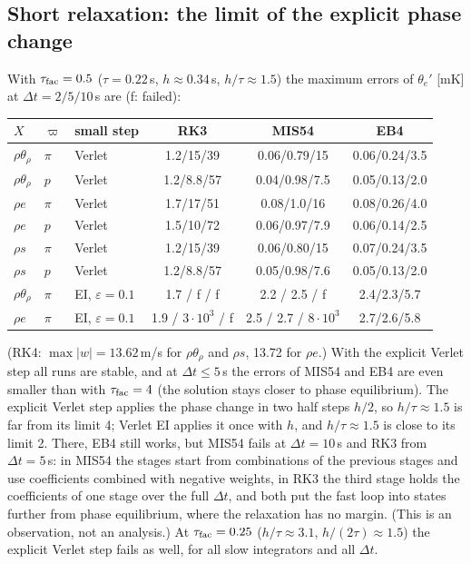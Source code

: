 \documentclass[11pt,a4paper]{article}
\newcommand{\dt}{\Delta t}
\newcommand{\pv}{\varpi}      %
\begin{document}
\subsection{Short relaxation: the limit of the explicit phase change}
With $\tau_{\rm fac}=0.5$ ($\tau=0.22$\,s, $h\approx0.34$\,s, $h/\tau\approx1.5$) the maximum errors of $\theta_e'$ [mK] at
$\dt=2/5/10$\,s are (f: failed):
\begin{center}\small
\begin{tabular}{lllccc}\toprule
$X$ & $\pv$ & small step & RK3 & MIS54 & EB4\\\midrule
$\rho\theta_\rho$ & $\pi$ & Verlet & 1.2/15/39 & 0.06/0.79/15 & 0.06/0.24/3.5\\
$\rho\theta_\rho$ & $p$ & Verlet & 1.2/8.8/57 & 0.04/0.98/7.5 & 0.05/0.13/2.0\\
$\rho e$ & $\pi$ & Verlet & 1.7/17/51 & 0.08/1.0/16 & 0.08/0.26/4.0\\
$\rho e$ & $p$ & Verlet & 1.5/10/72 & 0.06/0.97/7.9 & 0.06/0.14/2.5\\
$\rho s$ & $\pi$ & Verlet & 1.2/15/39 & 0.06/0.80/15 & 0.07/0.24/3.5\\
$\rho s$ & $p$ & Verlet & 1.2/8.8/57 & 0.05/0.98/7.6 & 0.05/0.13/2.0\\\midrule
$\rho\theta_\rho$ & $\pi$ & EI, $\varepsilon=0.1$ & 1.7 / f / f & 2.2 / 2.5 / f & 2.4/2.3/5.7\\
$\rho e$ & $\pi$ & EI, $\varepsilon=0.1$ & 1.9 / $3\cdot10^3$ / f & 2.5 / 2.7 / $8\cdot10^3$ & 2.7/2.6/5.8\\\bottomrule
\end{tabular}
\end{center}
(RK4: $\max|w|=13.62$\,m/s for $\rho\theta_\rho$ and $\rho s$, 13.72 for $\rho e$.) With the explicit Verlet step all runs are stable,
and at $\dt\le5$\,s the errors of MIS54 and EB4 are even smaller than with $\tau_{\rm fac}=4$ (the solution stays closer to phase equilibrium).
The explicit Verlet step applies the phase change in two half steps $h/2$, so $h/\tau\approx1.5$ is far from its
limit 4; Verlet EI applies it once with $h$, and $h/\tau\approx1.5$ is close to its limit 2. There, EB4 still works,
but MIS54 fails at $\dt=10$\,s and RK3 from $\dt=5$\,s: in MIS54 the stages start from
combinations of the previous stages and use coefficients combined with negative weights, in RK3 the
third stage holds the coefficients of one stage over the full $\dt$, and both put the fast loop into
states further from phase equilibrium, where the relaxation has no margin. (This is an observation,
not an analysis.) At $\tau_{\rm fac}=0.25$ ($h/\tau\approx3.1$, $h/(2\tau)\approx1.5$) the explicit Verlet step fails as well, for all
slow integrators and all $\dt$.
\end{document}

